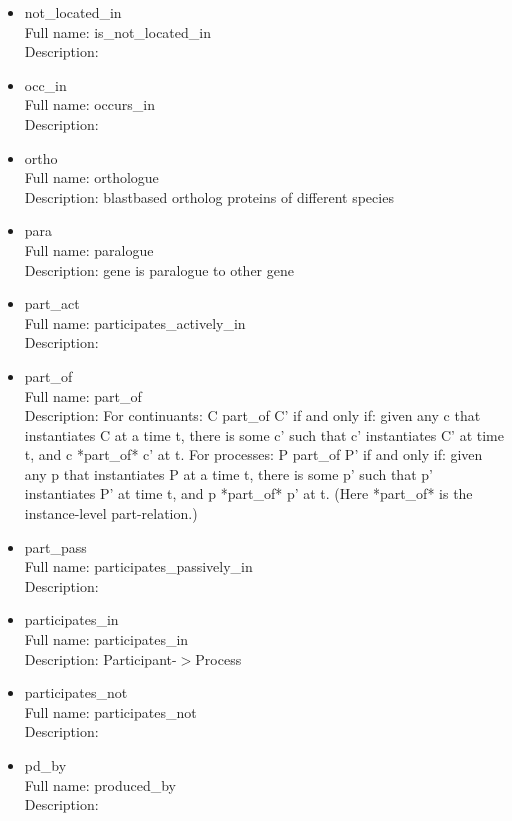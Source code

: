 \begin{itemize}
\item{not\_located\_in}\\ Full name: is\_not\_located\_in\\ Description: 

\item{occ\_in}\\ Full name: occurs\_in\\ Description: 

\item{ortho}\\ Full name: orthologue\\ Description: blastbased ortholog proteins of different species 

\item{para}\\ Full name: paralogue\\ Description: gene is paralogue to other gene 

\item{part\_act}\\ Full name: participates\_actively\_in\\ Description: 

\item{part\_of}\\ Full name: part\_of\\ Description: For continuants: C part\_of C' if and only if: given any c that instantiates C at a time t, there is some c' such that c' instantiates C' at time t, and c *part\_of* c' at t. For processes: P part\_of P' if and only if: given any p that instantiates P at a time t, there is some p' such that p' instantiates P' at time t, and p *part\_of* p' at t. (Here *part\_of* is the instance-level part-relation.) 

\item{part\_pass}\\ Full name: participates\_passively\_in\\ Description: 

\item{participates\_in}\\ Full name: participates\_in\\ Description: Participant-$>$Process 

\item{participates\_not}\\ Full name: participates\_not\\ Description: 

\item{pd\_by}\\ Full name: produced\_by\\ Description: 


\end{itemize}
